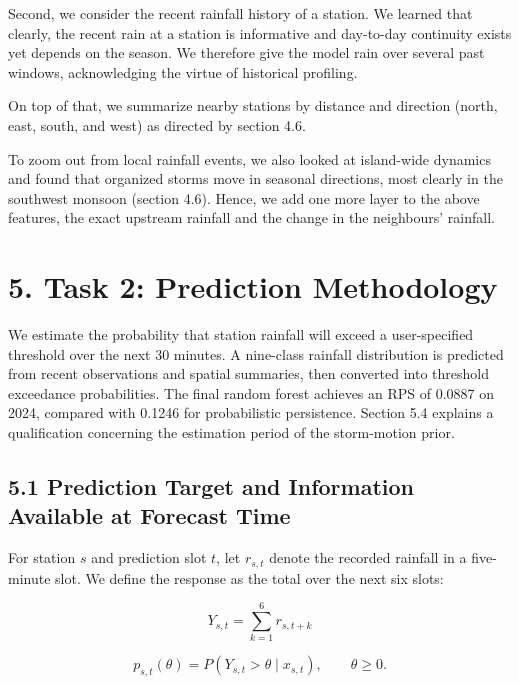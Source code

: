 \documentclass[11pt,a4paper]{article}
\begin{document}
Second, we consider the recent rainfall history of a station. We learned that clearly, the recent rain at a station is informative and day-to-day continuity exists yet depends on the season. We therefore give the model rain over several past windows, acknowledging the virtue of historical profiling.


On top of that, we summarize nearby stations by distance and direction (north, east, south, and west) as directed by section 4.6. 


To zoom out from local rainfall events, we also looked at island-wide dynamics and found that organized storms move in seasonal directions, most clearly in the southwest monsoon (section 4.6). Hence, we add one more layer to the above features, the exact upstream rainfall and the change in the neighbours’ rainfall. 


\FloatBarrier

\section*{5. Task 2: Prediction Methodology}
{}


We estimate the probability that station rainfall will exceed a user-specified threshold over the next 30 minutes. A nine-class rainfall distribution is predicted from recent observations and spatial summaries, then converted into threshold exceedance probabilities. The final random forest achieves an RPS of 0.0887 on 2024, compared with 0.1246 for probabilistic persistence. Section 5.4 explains a qualification concerning the estimation period of the storm-motion prior. 


\subsection*{5.1 Prediction Target and Information Available at Forecast Time}
{}


For station \(s\) and prediction slot \(t\), let \(r_{s,t}\) denote the recorded rainfall in a five-minute slot. We define the response as the total over the next six slots:


\[
Y_{s,t}=\sum_{k=1}^{6}r_{s,t+k}
\]


\[
p_{s,t}(\theta)=P(Y_{s,t}>\theta\mid x_{s,t}),\qquad\theta\geq0.
\]
\end{document}
